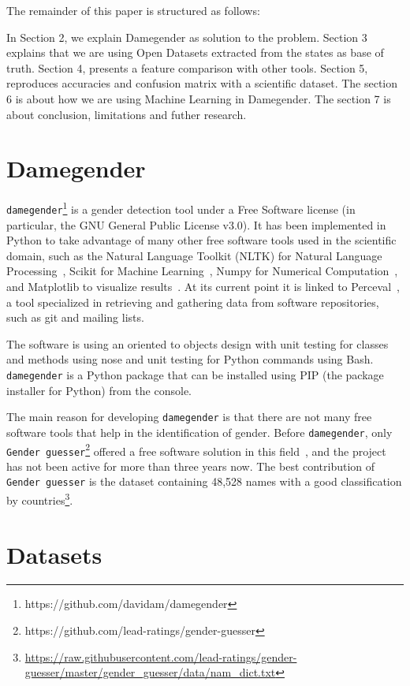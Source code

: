 \documentclass[a4paper]{article}
\begin{document}
The remainder of this paper is structured as follows:

In Section 2, we explain Damegender as solution to the
problem. Section 3 explains that we are using Open Datasets extracted
from the states as base of truth. Section 4, presents a feature
comparison with other tools.  Section 5, reproduces accuracies and
confusion matrix with a scientific dataset. The section 6 is about how
we are using Machine Learning in Damegender. The section 7 is about
conclusion, limitations and futher research.

\section{Damegender}

\texttt{damegender}\footnote{https://github.com/davidam/damegender} is a gender detection tool under a Free Software license (in particular, the GNU General Public License v3.0). 
It has been implemented in Python to take advantage of many other free software tools used in the scientific domain, such as the Natural Language Toolkit (NLTK) for Natural Language Processing~\cite{loper2002nltk}, Scikit for Machine Learning~\cite{pedregosa2011scikit}, Numpy for Numerical Computation~\cite{van2011numpy}, and Matplotlib to visualize results~\cite{hunter2007matplotlib}. 
At its current point it is linked to Perceval~\cite{duenas2018perceval}, a tool specialized in retrieving and gathering data from software repositories, such as git and mailing lists.

The software is using an oriented to objects design with unit testing for classes and methods using nose and unit testing for Python commands using Bash. 
\texttt{damegender} is a Python package that can be installed using PIP (the package installer for Python) from the console.

The main reason for developing \texttt{damegender} is that there are not many free software tools that help in the identification of gender. Before \texttt{damegender}, only \texttt{Gender guesser}\footnote{https://github.com/lead-ratings/gender-guesser} offered a free software solution in this field~\cite{krawetz2006gender}, and the project has not been active for more than three years now.
The best contribution of \texttt{Gender guesser} is the dataset containing 48,528 names with a good classification by countries\footnote{\url{https://raw.githubusercontent.com/lead-ratings/gender-guesser/master/gender_guesser/data/nam_dict.txt}}.

\section{Datasets}
\end{document}
